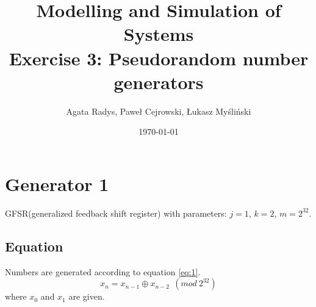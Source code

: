 \documentclass[a4paper,10pt]{article}
\title{Modelling and Simulation of Systems\\ \Large
Exercise 3: Pseudorandom number generators}
\author{Agata Radys, Paweł Cejrowski, Łukasz Myśliński}
\date{\today}
\begin{document}
\maketitle


\section{Generator 1}

GFSR(generalized feedback shift register) with parameters: $j=1$, $k=2$, $m=2^{32}$.
\subsection{Equation}
Numbers are generated according to equation \ref{eq:1}.
\begin{equation}
\label{eq:1}
  x_n = x_{n-1} \oplus x_{n-2}\ \ (mod\ 2^{32})
\end{equation}
where ${x_0}$ and ${x_1}$ are given.
\end{document}
